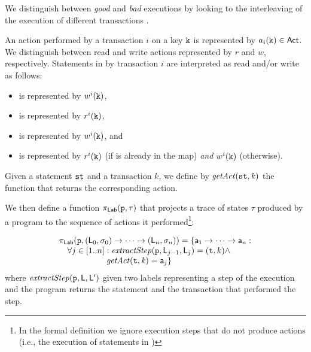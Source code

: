 We distinguish between \emph{good} and \emph{bad} executions by looking to the interleaving of the execution of different transactions .


An action performed by a transaction $i$ on a key $\mathtt{k}$ is represented by $a_i(\mathtt{k}) \in \mathsf{Act}$. We distinguish between read and write actions represented by $r$ and $w$, respectively. Statements in  by transaction $i$ are interpreted as read and/or write as follows:
\begin{itemize}
\item {} is represented by $w^i(\mathtt{k})$,
\item {} is represented by $r^i(\mathtt{k})$,
\item {} is represented by $w^i(\mathtt{k})$, and
\item {} is represented by $r^i(\mathtt{k})$ (if  is already in the map) \emph{and} $w^i(\mathtt{k})$ (otherwise).
\end{itemize}
Given a statement $\mathtt{st}$ and a transaction $k$, we define by $\mathit{getAct(\mathtt{st}, k)}$ the function that returns the corresponding action.

We then define a function $\pi_{\mathsf{Lab}}(\mathtt{p}, \tau)$ that projects a trace of states $\tau$ produced by a program  to the sequence of actions it performed\footnote{In the formal definition we ignore execution steps that do not produce actions (i.e., the execution of statements in )}:

\[
\begin{array}{l}
\pi_{\mathsf{Lab}}(\mathtt{p}, (\mathsf{L}_0, \mathsf{\sigma}_0) \to \cdots \to (\mathsf{L}_n, \mathsf{\sigma}_n)) = \{
\mathsf{a}_1 \to \cdots \to \mathsf{a}_n :\\
\hspace{10pt} \forall j \in [1..n] : \mathit{extractStep}(\mathtt{p}, \mathsf{L}_{j-1}, \mathsf{L}_j)=(\mathtt{t}, k) \land\\
\hspace{57pt} \mathit{getAct(\mathtt{t}, k)}=\mathsf{a}_j \}\\
\end{array}
\]
where $\mathit{extractStep}(\mathtt{p}, \mathsf{L}, \mathsf{L}')$ given two labels representing a step of the execution and the program returns the statement and the transaction that performed the step.

